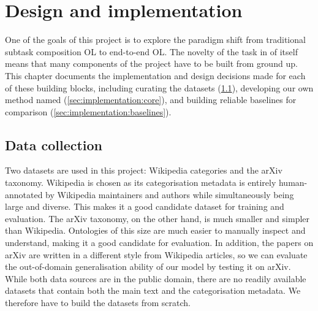 \chapter{Design and implementation}  \label{chap:implementation}

One of the goals of this project is to explore the paradigm shift from traditional subtask composition OL to end-to-end OL. The novelty of the task in of itself means that many components of the project have to be built from ground up. This chapter documents the implementation and design decisions made for each of these building blocks, including curating the datasets (\cref{sec:implementation:data-collection}), developing our own method named \textbf{\name} (\cref{sec:implementation:core}), and building reliable baselines for comparison (\cref{sec:implementation:baselines}).



\section{Data collection}  \label{sec:implementation:data-collection}

Two datasets are used in this project: Wikipedia categories and the arXiv taxonomy. Wikipedia is chosen as its categorisation metadata is entirely human-annotated by Wiki\-pedia maintainers and authors while simultaneously being large and diverse. This makes it a good candidate dataset for training and evaluation. The arXiv taxonomy, on the other hand, is much smaller and simpler than Wikipedia. Ontologies of this size are much easier to manually inspect and understand, making it a good candidate for evaluation. In addition, the papers on arXiv are written in a different style from Wikipedia articles, so we can evaluate the out-of-domain generalisation ability of our model by testing it on arXiv. While both data sources are in the public domain, there are no readily available datasets that contain both the main text and the categorisation metadata. We therefore have to build the datasets from scratch.

